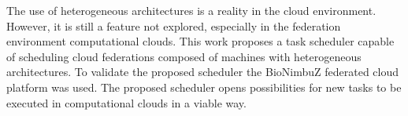 The use of heterogeneous architectures is a reality in the cloud environment. However, it is still a feature not explored, especially in the federation environment computational clouds. This work proposes a task scheduler capable of scheduling cloud federations composed of machines with heterogeneous architectures. To validate the proposed scheduler the BioNimbuZ federated cloud platform was used. The proposed scheduler opens possibilities for new tasks to be executed in computational clouds in a viable way.